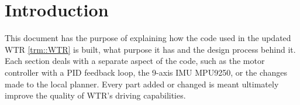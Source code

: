 \section{Introduction}

This document has the purpose of explaining how the code used in the updated WTR \ref{trm::WTR} is built, what purpose it has and the design process behind it.
Each section deals with a separate aspect of the code, such as the motor controller with a PID feedback loop, the 9-axis IMU MPU9250, or the changes made to the local planner.
Every part added or changed is meant ultimately improve the quality of WTR's driving capabilities.
